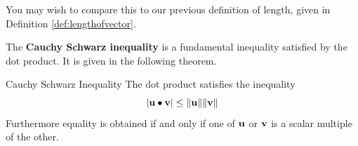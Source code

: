 You may wish to compare this to our previous definition of length, 
given in Definition \ref{def:lengthofvector}. 

The \textbf{Cauchy Schwarz inequality} is a fundamental inequality satisfied by the dot product. 
 It is given in the following theorem.

\begin{theorem}{Cauchy Schwarz Inequality}\label{thm:cauchyschwarzinequality}
The dot product satisfies the inequality
\begin{equation}
\left\vert \mathbf{u}\bullet \mathbf{v}\right\vert \leq \| \mathbf{u}\| \| \mathbf{v}\|   \label{cauchy}
\end{equation}
Furthermore equality is obtained if and only if one of $\mathbf{u}$ or $\mathbf{v}$ is a scalar multiple of the other.
\end{theorem}

